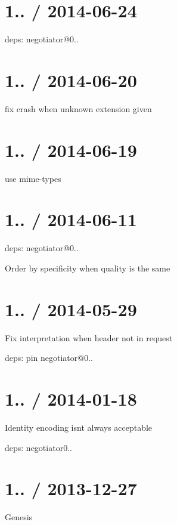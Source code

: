 \section*{1.. / 2014-\/06-\/24 }


\begin{DoxyItemize}
\item deps\+: negotiator@0..
\end{DoxyItemize}

\section*{1.. / 2014-\/06-\/20 }


\begin{DoxyItemize}
\item fix crash when unknown extension given
\end{DoxyItemize}

\section*{1.. / 2014-\/06-\/19 }


\begin{DoxyItemize}
\item use {\ttfamily mime-\/types}
\end{DoxyItemize}

\section*{1.. / 2014-\/06-\/11 }


\begin{DoxyItemize}
\item deps\+: negotiator@0..
\begin{DoxyItemize}
\item Order by specificity when quality is the same
\end{DoxyItemize}
\end{DoxyItemize}

\section*{1.. / 2014-\/05-\/29 }


\begin{DoxyItemize}
\item Fix interpretation when header not in request
\item deps\+: pin negotiator@0..
\end{DoxyItemize}

\section*{1.. / 2014-\/01-\/18 }


\begin{DoxyItemize}
\item Identity encoding isn\textquotesingle{}t always acceptable
\item deps\+: negotiator0..
\end{DoxyItemize}

\section*{1.. / 2013-\/12-\/27 }


\begin{DoxyItemize}
\item Genesis 
\end{DoxyItemize}